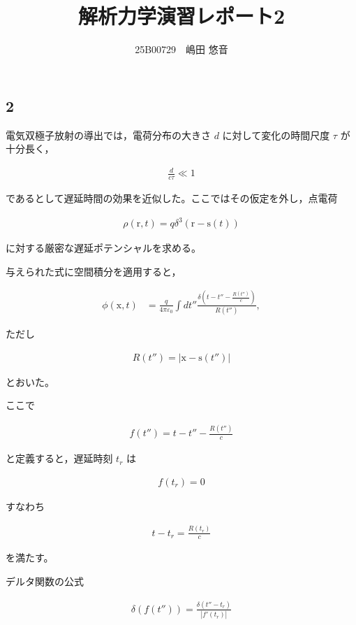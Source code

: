 \documentclass[platex,dvipdfmx,a4paper]{jsarticle}
\title{解析力学演習レポート2}
\author{25B00729　嶋田 悠音}
\newcommand{\vect}[1]{\boldsymbol{\mathrm{#1}}}
\begin{document}
\maketitle
\subsection*{2}

電気双極子放射の導出では，電荷分布の大きさ $d$ に対して変化の時間尺度 $\tau$ が十分長く，

\begin{align*}
\frac{d}{c\tau}\ll 1
\end{align*}

であるとして遅延時間の効果を近似した。ここではその仮定を外し，点電荷

\begin{align*}
\rho(\vect{r},t)
=
q\delta^3(\vect{r}-\vect{s}(t))
\end{align*}

に対する厳密な遅延ポテンシャルを求める。

与えられた式に空間積分を適用すると，

\begin{align*}
\phi(\vect{x},t)
&=
\frac{q}{4\pi\varepsilon_0}
\int dt''
\frac{\delta\!\left(
t-t''-\frac{R(t'')}{c}
\right)}
{R(t'')} ,
\end{align*}

ただし

\begin{align*}
R(t'')
=
|\vect{x}-\vect{s}(t'')|
\end{align*}

とおいた。

ここで

\begin{align*}
f(t'')
=
t-t''-\frac{R(t'')}{c}
\end{align*}

と定義すると，遅延時刻 $t_r$ は

\begin{align*}
f(t_r)=0
\end{align*}

すなわち

\begin{align*}
t-t_r
=
\frac{R(t_r)}{c}
\end{align*}

を満たす。

デルタ関数の公式

\begin{align*}
\delta(f(t''))
=
\frac{\delta(t''-t_r)}
{|f'(t_r)|}
\end{align*}
\end{document}
